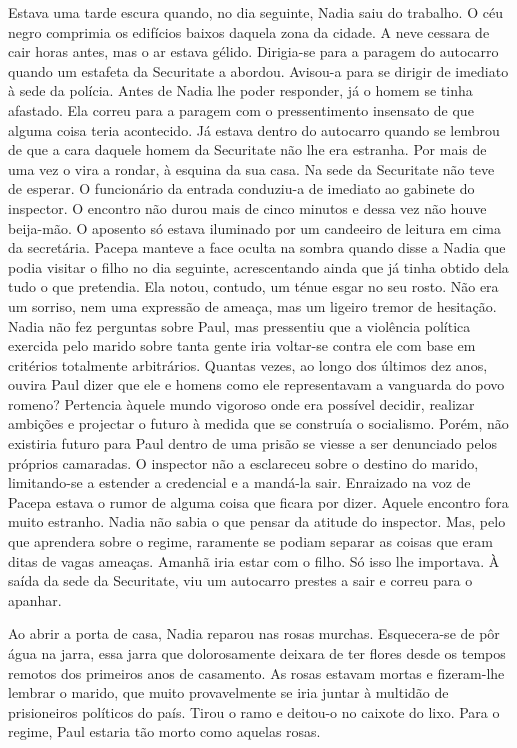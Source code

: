 Estava uma tarde escura quando, no dia seguinte, Nadia saiu do trabalho.
O céu negro comprimia os edifícios baixos daquela zona da cidade. A
neve cessara de cair horas antes, mas o ar estava gélido. Dirigia-se
para a paragem do autocarro quando um estafeta da Securitate a abordou.
Avisou-a para se dirigir de imediato à sede da polícia. Antes de Nadia
lhe poder responder, já o homem se tinha afastado. Ela correu para a
paragem com o pressentimento insensato de que alguma coisa teria
acontecido. Já estava dentro do autocarro quando se lembrou de que a
cara daquele homem da Securitate não lhe era estranha. Por mais de uma
vez o vira a rondar, à esquina da sua casa. Na sede da Securitate não
teve de esperar. O funcionário da entrada conduziu-a de imediato ao
gabinete do inspector. O encontro não durou mais de cinco minutos e
dessa vez não houve beija-mão. O aposento só estava iluminado por um
candeeiro de leitura em cima da secretária. Pacepa manteve a face
oculta na sombra quando disse a Nadia que podia visitar o filho no dia
seguinte, acrescentando ainda que já tinha obtido dela tudo o que
pretendia. Ela notou, contudo, um ténue esgar no seu rosto. Não era um
sorriso, nem uma expressão de ameaça, mas um ligeiro tremor de
hesitação. Nadia não fez perguntas sobre Paul, mas pressentiu que a
violência política exercida pelo marido sobre tanta gente iria voltar-se
contra ele com base em critérios totalmente arbitrários. Quantas vezes,
ao longo dos últimos dez anos, ouvira Paul dizer que ele e homens como
ele representavam a vanguarda do povo romeno? Pertencia àquele mundo
vigoroso onde era possível decidir, realizar ambições e projectar o
futuro à medida que se construía o socialismo. Porém, não existiria
futuro para Paul dentro de uma prisão se viesse a ser denunciado pelos
próprios camaradas. O inspector não a esclareceu sobre o destino do
marido, limitando-se a estender a credencial e a mandá-la sair.
Enraizado na voz de Pacepa estava o rumor de alguma coisa que ficara por
dizer. Aquele encontro fora muito estranho. Nadia não sabia o que pensar
da atitude do inspector. Mas, pelo que aprendera sobre o regime,
raramente se podiam separar as coisas que eram ditas de vagas ameaças.
Amanhã iria estar com o filho. Só isso lhe importava. À saída da sede da
Securitate, viu um autocarro prestes a sair e correu para o apanhar.

Ao abrir a porta de casa, Nadia reparou nas rosas murchas.
Esquecera-se de pôr água na jarra, essa jarra que dolorosamente deixara
de ter flores desde os tempos remotos dos primeiros anos de casamento.
As rosas estavam mortas e fizeram-lhe lembrar o marido, que muito provavelmente se iria juntar à multidão de prisioneiros políticos
do país. Tirou o ramo e deitou-o no caixote do lixo. Para o regime, Paul
estaria tão morto como aquelas rosas.

